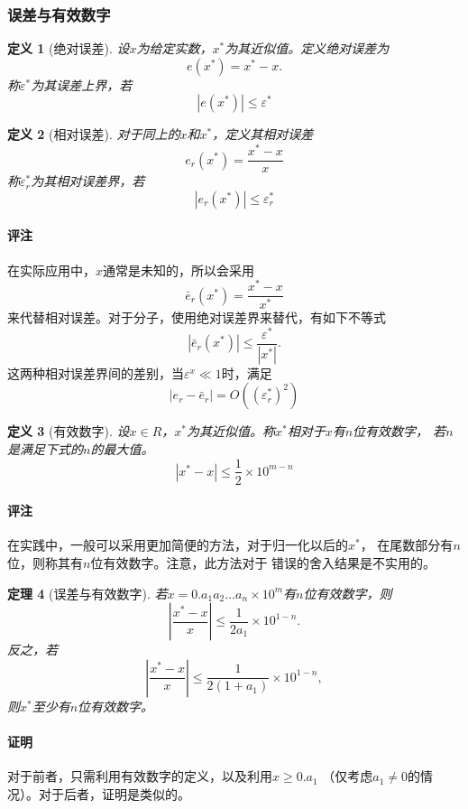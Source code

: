 \documentclass[12pt, a4paper]{article}
\theoremstyle{margin}
\newtheorem{thm}{定理}
\newtheorem{defi}[thm]{定义}
\newcommand{\aoneton}{a_1a_2\dots a_n}
\newcommand{\remark}{\paragraph{评注}}
\newcommand{\proof}{\paragraph{证明}}
\begin{document}
\subsubsection{误差与有效数字}
  \begin{defi}[绝对误差]
    设$x$为给定实数，$x^*$为其近似值。定义绝对误差为
    \[
      e(x^*) = x^* - x.
    \]
    称$\varepsilon^*$为其误差上界，若
    \[
      |e(x^*)| \le \varepsilon^*
    \]
  \end{defi}

  \begin{defi}[相对误差]
    对于同上的$x$和$x^*$，定义其相对误差
    \[
      e_r(x^*)=\frac{x^* - x}{x}
    \]
    称$\varepsilon_r^*$为其相对误差界，若
    \[
      |e_r(x^*)|\le\varepsilon_r^*
    \]
  \end{defi}
  \remark
    在实际应用中，$x$通常是未知的，所以会采用
    \[
      \bar{e}_r(x^*)=\frac{x^*-x}{x^*}
    \]
    来代替相对误差。对于分子，使用绝对误差界来替代，有如下不等式
    \[
      |\bar{e}_r(x^*)| \le \frac{\varepsilon^*}{|x^*|}.
    \]
    这两种相对误差界间的差别，当$\varepsilon^x\ll 1$时，满足
    \[
      |e_r-\bar{e}_r|=O((\varepsilon_r^*)^2)
    \]

  \begin{defi}[有效数字]
    设$x\in R$，$x^*$为其近似值。称$x^*$相对于$x$有$n$位有效数字，
    若$n$是满足下式的$n$的最大值。
    \[
      |x^* - x| \le \frac{1}{2} \times 10^{m - n}
    \]
  \end{defi}
  \remark
    在实践中，一般可以采用更加简便的方法，对于归一化以后的$x^*$，
    在尾数部分有$n$位，则称其有$n$位有效数字。注意，此方法对于
    错误的舍入结果是不实用的。

  \begin{thm}[误差与有效数字]
    若$x=0.\aoneton\times10^m$有$n$位有效数字，则
    \[
      \left|\frac{x^*-x}{x}\right| \le
      \frac{1}{2a_1}\times10^{1-n}.
    \]
    反之，若
    \[
      \left|\frac{x^*-x}{x}\right| \le
      \frac{1}{2(1+a_1)}\times 10^{1-n},
    \]
    则$x^*$至少有$n$位有效数字。
  \end{thm}
  \proof
    对于前者，只需利用有效数字的定义，以及利用$x\ge 0.a_1$
    （仅考虑$a_1\ne0$的情况）。对于后者，证明是类似的。
\end{document}
